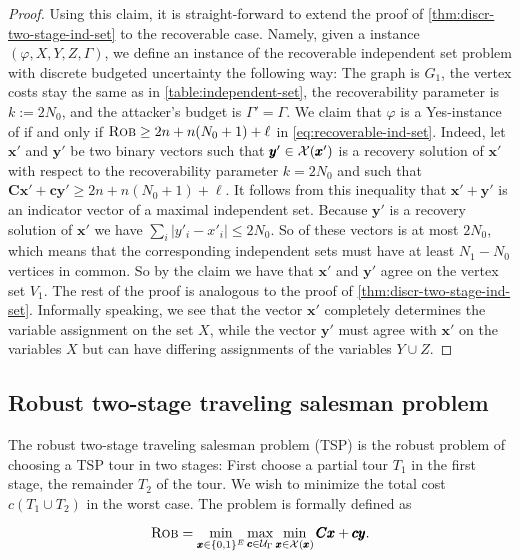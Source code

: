 \begin{proof}
Using this claim, it is straight-forward to extend the proof of \cref{thm:discr-two-stage-ind-set} to the recoverable case.
 Namely, given a {\radj} instance $(\varphi,X,Y,Z,\Gamma)$, we define an instance of the recoverable independent set problem with discrete budgeted uncertainty the following way: 
 The graph is $G_1$, the vertex costs stay the same as in \cref{table:independent-set}, the recoverability parameter is $k := 2N_0$, and the attacker's budget is $\Gamma' = \Gamma$. 
 We claim that $\varphi$ is a Yes-instance of {\radj} if and only if $\textsc{Rob} \geq 2n + n(N_0+1) + \ell$ in \cref{eq:recoverable-ind-set}.
Indeed, let $\pmb x'$ and $\pmb y'$ be two binary vectors such that $\pmb y' \in \mathcal{X}(\pmb x')$ is a recovery solution of $\pmb x'$ with respect to the recoverability parameter $k = 2N_0$ and such that $\pmb C \pmb x' + \pmb c \pmb y' \geq 2n + n(N_0+1) + \ell$. 
It follows from this inequality that $\pmb x' + \pmb y'$ is an indicator vector of a maximal independent set. 
Because $\pmb y'$ is a recovery solution of $\pmb x'$ we have $\sum_i |y'_i - x'_i| \leq 2N_0$. So  of these vectors is at most $2N_0$, which means that the corresponding independent sets must have at least $N_1 - N_0$ vertices in common.
So by the claim we have that $\pmb x'$ and $\pmb y'$ agree on the vertex set $V_1$. 
The rest of the proof is analogous to the proof of \cref{thm:discr-two-stage-ind-set}.
 Informally speaking, we see that the vector $\pmb x'$ completely determines the variable assignment on the set $X$, while the vector $\pmb y'$ must agree with $\pmb x'$ on the variables $X$ but can have differing assignments of the variables $Y \cup Z$.
\end{proof}

\subsection{Robust two-stage traveling salesman problem}
\label{subsec:two-stage-tsp}

The robust two-stage traveling salesman problem (TSP) is the robust problem of choosing a TSP tour in two stages: 
First choose a partial tour $T_1$ in the first stage,  the remainder $T_2$ of the tour.
We wish to minimize the total cost $c(T_1 \cup T_2)$ in the worst case. 
The problem is formally defined as

\begin{equation*}
\textsc{Rob} = \min_{\pmb x \in \{ 0,1 \}^E} \max_{\pmb c \in \mathcal{U}_\Gamma } \min_{\pmb x \in \mathcal{X}(\pmb x)} \pmb C \pmb x + \pmb c \pmb y. 
\end{equation*} 

